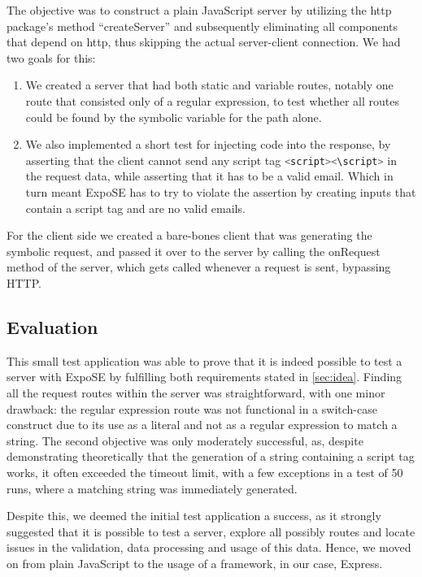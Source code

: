 The objective was to construct a plain JavaScript server by utilizing the http package's method “createServer” and subsequently eliminating all components that depend on http, thus skipping the actual server-client connection.
We had two goals for this: 
\begin{enumerate}
    \item  We created a server that had both static and variable routes, notably one route that consisted only of a regular expression, to test whether all routes could be found by the symbolic variable for the path alone.
    \item  We also implemented a short test for injecting code into the response, by asserting that the client cannot send any script tag \lstinline[language=JavaScript]{<script><\script>} in the request data, while asserting that it has to be a valid email. Which in turn meant ExpoSE has to try to violate the assertion by creating inputs that contain a script tag and are no valid emails. 
\end{enumerate}
For the client side we created a bare-bones client that was generating the symbolic request, and passed it over to the server by calling the onRequest method of the server, which gets called whenever a request is sent, bypassing HTTP. 

\subsection{Evaluation}
This small test application was able to prove that it is indeed possible to test a server with ExpoSE by fulfilling both requirements stated in \autoref{sec:idea}. Finding all the request routes within the server was straightforward, with one minor drawback: the regular expression route was not functional in a switch-case construct due to its use as a literal and not as a regular expression to match a string. 
The second objective was only moderately successful, as, despite demonstrating theoretically that the generation of a string containing a script tag works, it often exceeded the timeout limit, with a few exceptions in a test of 50 runs, where a matching string was immediately generated.

Despite this, we deemed the initial test application a success, as it strongly suggested that it is possible to test a server, explore all possibly routes and locate issues in the validation, data processing and usage of this data. Hence, we moved on from plain JavaScript to the usage of a framework, in our case, Express.
